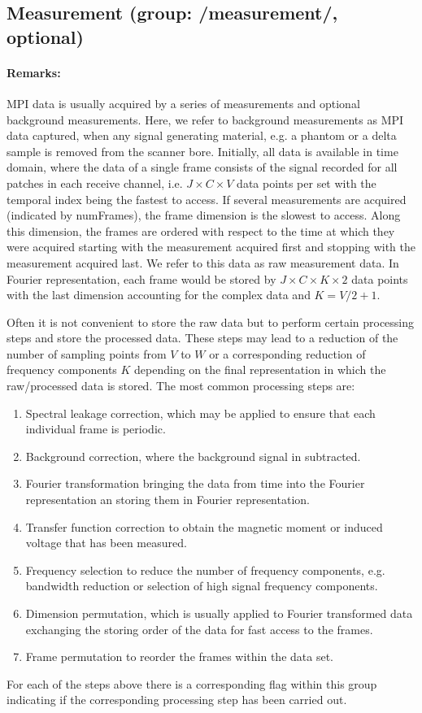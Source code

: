 \documentclass[landscape,a4paper]{article} %
\newcommand{\inlvar}[1]{{\ttfamily#1}}
\begin{document}
\subsection{Measurement (group: \inlvar{/measurement/}, optional)}
\begin{multicols}{2}

\paragraph{Remarks:}
MPI data is usually acquired by a series of measurements and optional background measurements. Here, we refer to background measurements as MPI data captured, when any signal generating material, e.g. a phantom or a delta sample is removed from the scanner bore. Initially, all data is available in time domain, where the data of a single frame consists of the signal recorded for all patches in each receive channel, i.e. $J \times C \times V$ data points per set with the temporal index being the fastest to access.  If several measurements are acquired (indicated by \inlvar{numFrames}), the frame dimension is the slowest to access. Along this dimension, the frames are ordered with respect to the time at which they were acquired starting with the measurement acquired first and stopping with the measurement acquired last. We refer to this data as raw measurement data. In Fourier representation, each frame would be stored by $J \times C\times K \times 2$ data points with the last dimension accounting for the complex data and $K = V/2 +1$.

Often it is not convenient to store the raw data but to perform certain processing steps and store the processed data. These steps may lead to a reduction of the number of sampling points from $V$ to $W$ or a corresponding reduction of frequency components $K$ depending on the final representation in which the raw/processed data is stored. The most common processing steps are:
\begin{enumerate}
	\item Spectral leakage correction, which may be applied to ensure that each individual frame is periodic.
	\item Background correction, where the background signal in subtracted.
	\item Fourier transformation bringing the data from time into the Fourier representation an storing them in Fourier representation.
	\item Transfer function correction to obtain the magnetic moment or induced voltage that has been measured.
	\item Frequency selection to reduce the number of frequency components, e.g. bandwidth reduction or selection of high signal frequency components.
	\item Dimension permutation, which is usually applied to Fourier transformed data exchanging the storing order of the data for fast access to the frames.
	\item Frame permutation to reorder the frames within the data set.
\end{enumerate}
For each of the steps above there is a corresponding flag within this group indicating if the corresponding processing step has been carried out. 


\end{multicols}
\end{document}
